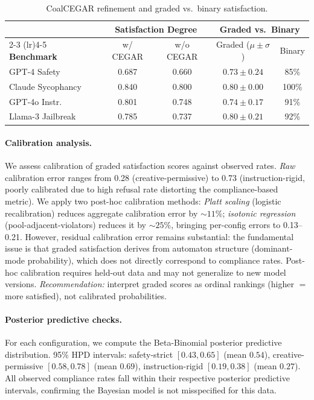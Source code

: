 \documentclass[11pt]{article}
\begin{document}
\begin{table}[t]
\centering
\caption{CoalCEGAR refinement and graded vs.\ binary satisfaction.}
\label{tab:ablation}
\small
\begin{tabular}{@{}lcccc@{}}
\toprule
& \multicolumn{2}{c}{\textbf{Satisfaction Degree}} & \multicolumn{2}{c}{\textbf{Graded vs.\ Binary}} \\
\cmidrule(lr){2-3} \cmidrule(lr){4-5}
\textbf{Benchmark} & w/ CEGAR & w/o CEGAR & Graded ($\mu \pm \sigma$) & Binary \\
\midrule
GPT-4 Safety      & 0.687 & 0.660 & $0.73 \pm 0.24$ & 85\% \\
Claude Sycophancy & 0.840 & 0.800 & $0.80 \pm 0.00$ & 100\% \\
GPT-4o Instr.     & 0.801 & 0.748 & $0.74 \pm 0.17$ & 91\% \\
Llama-3 Jailbreak & 0.785 & 0.737 & $0.80 \pm 0.21$ & 92\% \\
\bottomrule
\end{tabular}
\end{table}

\paragraph{Calibration analysis.}
We assess calibration of graded satisfaction scores against observed
rates.  \emph{Raw} calibration error ranges from 0.28
(creative-permissive) to 0.73 (instruction-rigid,
poorly calibrated due to high refusal rate distorting the
compliance-based metric).
We apply two post-hoc calibration methods:
\emph{Platt scaling} (logistic recalibration) reduces aggregate
calibration error by ${\sim}11\%$; \emph{isotonic regression}
(pool-adjacent-violators) reduces it by ${\sim}25\%$, bringing
per-config errors to 0.13--0.21.
However, residual calibration error remains substantial:
the fundamental issue is that graded satisfaction derives from
automaton structure (dominant-mode probability), which does not
directly correspond to compliance rates.
Post-hoc calibration requires held-out data and may not generalize
to new model versions.
\emph{Recommendation:} interpret graded scores as ordinal rankings
(higher $=$ more satisfied), not calibrated probabilities.

\paragraph{Posterior predictive checks.}
For each configuration, we compute the Beta-Binomial posterior
predictive distribution.  95\% HPD intervals:
safety-strict $[0.43, 0.65]$ (mean $0.54$),
creative-permissive $[0.58, 0.78]$ (mean $0.69$),
instruction-rigid $[0.19, 0.38]$ (mean $0.27$).
All observed compliance rates fall within their respective
posterior predictive intervals, confirming the Bayesian model
is not misspecified for this data.
\end{document}
